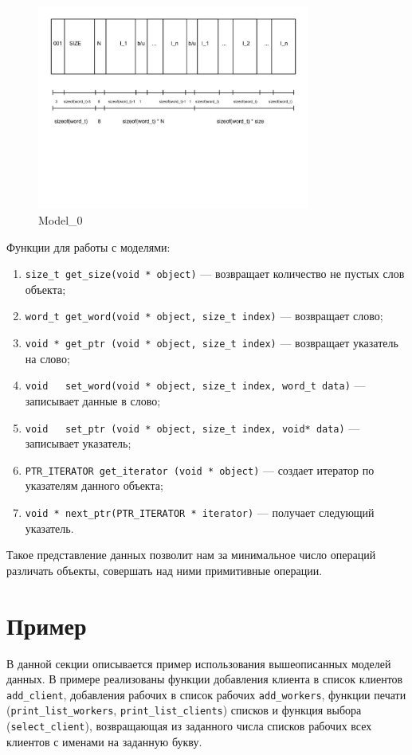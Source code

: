 \begin{figure}[h]
\includegraphics[width=0.8\textwidth]{Kren/3}
\caption{Model\_0}
\end{figure}

Функции для работы с моделями:
\begin{enumerate}
\item \lstinline{size_t get_size(void * object)} — возвращает количество не пустых слов объекта; 
\item \lstinline{word_t get_word(void * object, size_t index)} — возвращает слово;
\item \lstinline{void * get_ptr (void * object, size_t index)} — возвращает указатель на слово;
\item \lstinline{void   set_word(void * object, size_t index, word_t data)}  — записывает данные в слово;
\item \lstinline{void   set_ptr (void * object, size_t index, void* data)}   — записывает указатель;
\item \lstinline{PTR_ITERATOR get_iterator (void * object)} — создает итератор по указателям данного объекта;
\item \lstinline{void * next_ptr(PTR_ITERATOR * iterator)} — получает следующий указатель.
\end{enumerate}
Такое представление данных позволит нам за минимальное число операций различать объекты, совершать над ними примитивные операции.


\section{Пример}
В данной секции описывается пример использования вышеописанных моделей данных.
В примере реализованы функции добавления клиента в список клиентов \lstinline{add_client}, добавления рабочих в список рабочих \lstinline{add_workers}, 
функции печати (\lstinline{print_list_workers}, \lstinline{print_list_clients}) списков и функция выбора (\lstinline{select_client}),
возвращающая из заданного числа списков рабочих всех клиентов с именами на заданную букву.  

